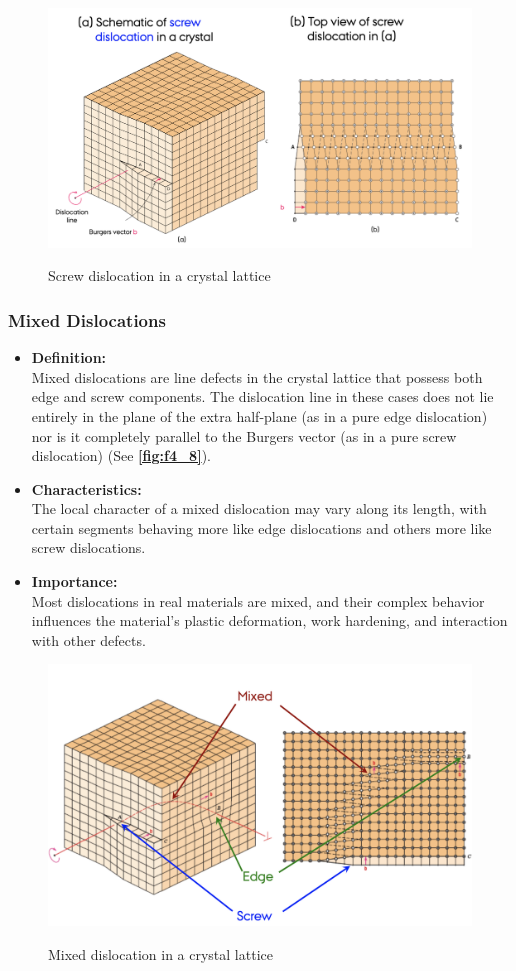 \begin{figure}[ht]
  \centering
  \caption{Screw dislocation in a crystal lattice}
  \includegraphics[width=0.55\linewidth]{./figures/f4_7.png}
  \label{fig:f4_7}
\end{figure}


\subsubsection{Mixed Dislocations}
\begin{itemize}
  \item \textbf{Definition:} \\
    Mixed dislocations are line defects in the crystal lattice that possess both edge and screw components. The dislocation line in these cases does not lie entirely in the plane of the extra half-plane (as in a pure edge dislocation) nor is it completely parallel to the Burgers vector (as in a pure screw dislocation) (See \textbf{\autoref{fig:f4_8}}).
  \item \textbf{Characteristics:} \\
    The local character of a mixed dislocation may vary along its length, with certain segments behaving more like edge dislocations and others more like screw dislocations.
  \item \textbf{Importance:} \\
    Most dislocations in real materials are mixed, and their complex behavior influences the material's plastic deformation, work hardening, and interaction with other defects.
\end{itemize}

\begin{figure} [ht]
  \centering
  \caption{Mixed dislocation in a crystal lattice}
  \includegraphics[width=0.5\linewidth]{./figures/f4_8.png}
  \label{fig:f4_8}
\end{figure}

